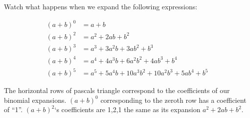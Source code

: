 \documentclass{article}
\begin{document}
{\center Watch what happens when we expand the following expressions:}
 
\begin{align*}
  (a + b)^0 &= a + b\\
  (a + b)^2 &= a^2 + 2ab + b^2\\
  (a + b)^3 &= a^3 + 3a^2b + 3ab^2 + b^3\\
  (a + b)^4 &= a^4 + 4a^3 b + 6a^2b^2 + 4ab^3 + b^4\\
  (a + b)^5 &= a^5 + 5a^4 b + 10a^3 b^2 + 10a^2 b^3 + 5ab^4+b^5
\end{align*} 
 
The horizontal rows of pascals triangle correspond to the coefficients of our binomial expansions. $(a+b)^0$ corresponding to the zeroth row has a coefficient of ``1''.  $(a+b)^2$`s coefficients are 1,2,1 the same as its expansion $ a^2+2ab+b^2$.
  
\end{document}
